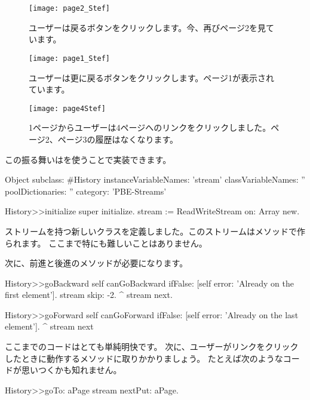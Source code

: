 \documentclass[a4paper,10pt,twoside]{book}
\begin{document}
\begin{figure}[!ht]
\centerline{\texttt{[image: page2\_Stef]}}
\caption{ユーザーは戻るボタンをクリックします。今、再びページ2を見ています。}
\vspace{.2in}
\end{figure}

\begin{figure}[!ht]
\centerline{\texttt{[image: page1\_Stef]}}
\caption{ユーザーは更に戻るボタンをクリックします。ページ1が表示されています。}
\vspace{.2in}
\end{figure}

\begin{figure}[!ht]
\centerline{\texttt{[image: page4Stef]}}
\caption{1ページからユーザーは4ページへのリンクをクリックしました。ページ2、ページ3の履歴はなくなります。}
\vspace{.2in}
\end{figure}

この振る舞いはを使うことで実装できます。

\begin{code}{}
Object subclass: #History
  instanceVariableNames: 'stream'
  classVariableNames: ''
  poolDictionaries: ''
  category: 'PBE-Streams'

History>>initialize
    super initialize.
    stream := ReadWriteStream on: Array new.
\end{code}

ストリームを持つ新しいクラスを定義しました。このストリームはメソッドで作られます。
ここまで特にも難しいことはありません。

次に、前進と後進のメソッドが必要になります。

\begin{code}{}
History>>goBackward
  self canGoBackward ifFalse: [self error: 'Already on the first element'].
  stream skip: -2.
  ^ stream next.

History>>goForward
  self canGoForward ifFalse: [self error: 'Already on the last element'].
  ^ stream next
\end{code}

ここまでのコードはとても単純明快です。
次に、ユーザーがリンクをクリックしたときに動作するメソッドに取りかかりましょう。
たとえば次のようなコードが思いつくかも知れません。

\begin{code}{}
History>>goTo: aPage
    stream nextPut: aPage.
\end{code}
\end{document}

